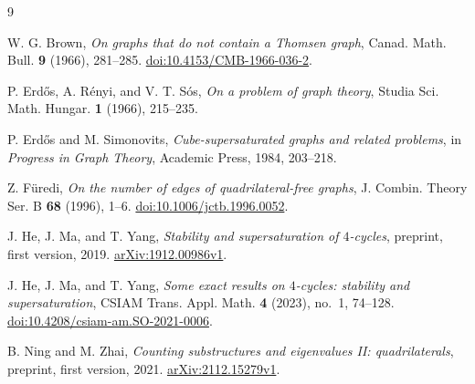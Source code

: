 \documentclass[11pt,reqno]{amsart}
\theoremstyle{definition}
\theoremstyle{remark}
\numberwithin{equation}{section}
\begin{document}
\begin{thebibliography}{9}

W. G. Brown,
\emph{On graphs that do not contain a Thomsen graph},
Canad. Math. Bull. \textbf{9} (1966), 281--285.
\href{https://doi.org/10.4153/CMB-1966-036-2}{doi:10.4153/CMB-1966-036-2}.

P. Erd\H{o}s, A. R\'enyi, and V. T. S\'os,
\emph{On a problem of graph theory},
Studia Sci. Math. Hungar. \textbf{1} (1966), 215--235.

P. Erd\H{o}s and M. Simonovits,
\emph{Cube-supersaturated graphs and related problems},
in \emph{Progress in Graph Theory}, Academic Press, 1984, 203--218.

Z. F\"uredi,
\emph{On the number of edges of quadrilateral-free graphs},
J. Combin. Theory Ser. B \textbf{68} (1996), 1--6.
\href{https://doi.org/10.1006/jctb.1996.0052}{doi:10.1006/jctb.1996.0052}.

J. He, J. Ma, and T. Yang,
\emph{Stability and supersaturation of $4$-cycles},
preprint, first version, 2019.
\newline\href{https://arxiv.org/abs/1912.00986v1}{arXiv:1912.00986v1}.

J. He, J. Ma, and T. Yang,
\emph{Some exact results on $4$-cycles: stability and supersaturation},
CSIAM Trans. Appl. Math. \textbf{4} (2023), no.~1, 74--128.
\href{https://doi.org/10.4208/csiam-am.SO-2021-0006}{doi:10.4208/csiam-am.SO-2021-0006}.

B. Ning and M. Zhai,
\emph{Counting substructures and eigenvalues II: quadrilaterals},
preprint, first version, 2021.
\href{https://arxiv.org/abs/2112.15279v1}{arXiv:2112.15279v1}.

\end{thebibliography}
\end{document}
